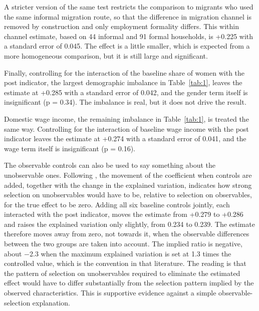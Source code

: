 A stricter version of the same test restricts the comparison to migrants who used the same informal migration route, so that the difference in migration channel is removed by construction and only employment formality differs. This within channel estimate, based on 44 informal and 91 formal households, is +0.225 with a standard error of 0.045. The effect is a little smaller, which is expected from a more homogeneous comparison, but it is still large and significant.

Finally, controlling for the interaction of the baseline share of women with the post indicator, the largest demographic imbalance in Table~\ref{tab:1}, leaves the estimate at +0.285 with a standard error of 0.042, and the gender term itself is insignificant (p = 0.34). The imbalance is real, but it does not drive the result.

Domestic wage income, the remaining imbalance in Table~\ref{tab:1}, is treated the same way. Controlling for the interaction of baseline wage income with the post indicator leaves the estimate at +0.274 with a standard error of 0.041, and the wage term itself is insignificant (p = 0.16).

The observable controls can also be used to say something about the unobservable ones. Following \cite{oster2019}, the movement of the coefficient when controls are added, together with the change in the explained variation, indicates how strong selection on unobservables would have to be, relative to selection on observables, for the true effect to be zero. Adding all six baseline controls jointly, each interacted with the post indicator, moves the estimate from +0.279 to +0.286 and raises the explained variation only slightly, from 0.234 to 0.239. The estimate therefore moves away from zero, not towards it, when the observable differences between the two groups are taken into account. The implied ratio is negative, about $-$2.3 when the maximum explained variation is set at 1.3 times the controlled value, which is the convention in that literature. The reading is that the pattern of selection on unobservables required to eliminate the estimated effect would have to differ substantially from the selection pattern implied by the observed characteristics. This is supportive evidence against a simple observable-selection explanation.

